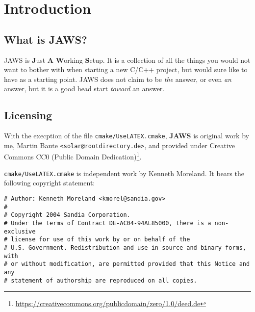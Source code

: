 
\newcommand{\doctitle}{JAWS Technical Guide}
\newcommand{\docauthors}{Martin Baute}



\section{Introduction}

\subsection{What is JAWS?}

JAWS is \textbf{J}ust \textbf{A} \textbf{W}orking \textbf{S}etup. It is a collection of all the things you would not want to bother with when starting a new C/C++ project, but would sure like to have as a starting point. JAWS does not claim to be \emph{the} answer, or even \emph{an} answer, but it is a good head start \emph{toward} an answer.

\subsection{Licensing}

With the execption of the file \lstinline{cmake/UseLATEX.cmake}, \textbf{JAWS} is original work by me, Martin Baute \lstinline{<solar@rootdirectory.de>}, and provided under Creative Commons CC0 (Public Domain Dedication)\footnote{\url{https://creativecommons.org/publicdomain/zero/1.0/deed.de}}.

\lstinline{cmake/UseLATEX.cmake} is independent work by Kenneth Moreland. It bears the following copyright statement:

\begin{lstlisting}[basicstyle=\ttfamily\scriptsize]
# Author: Kenneth Moreland <kmorel@sandia.gov>
#
# Copyright 2004 Sandia Corporation.
# Under the terms of Contract DE-AC04-94AL85000, there is a non-exclusive
# license for use of this work by or on behalf of the
# U.S. Government. Redistribution and use in source and binary forms, with
# or without modification, are permitted provided that this Notice and any
# statement of authorship are reproduced on all copies.
\end{lstlisting}


